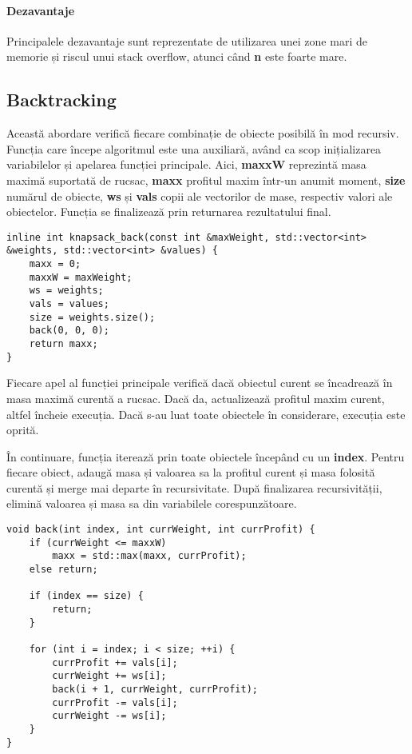 \documentclass[runningheads]{llncs}
\begin{document}
\paragraph{Dezavantaje} Principalele dezavantaje sunt reprezentate de utilizarea unei zone mari de memorie
și riscul unui stack overflow, atunci când \textbf{n} este foarte mare.

\subsection{Backtracking}

Această abordare verifică fiecare combinație de obiecte posibilă în mod recursiv. Funcția care începe
algoritmul este una auxiliară, având ca scop inițializarea variabilelor și apelarea funcției principale.
Aici, \textbf{maxxW} reprezintă masa maximă suportată de rucsac, \textbf{maxx} profitul maxim într-un anumit
moment, \textbf{size} numărul de obiecte, \textbf{ws} și \textbf{vals} copii ale vectorilor de mase, respectiv
valori ale obiectelor. Funcția se finalizează prin returnarea rezultatului final.

\begin{lstlisting}
inline int knapsack_back(const int &maxWeight, std::vector<int> &weights, std::vector<int> &values) {
	maxx = 0;
	maxxW = maxWeight;
	ws = weights;
	vals = values;
	size = weights.size();
	back(0, 0, 0);
	return maxx;
}
\end{lstlisting}

Fiecare apel al funcției principale verifică dacă obiectul curent se încadrează în
masa maximă curentă a rucsac. Dacă da, actualizează profitul maxim curent, altfel încheie
execuția. Dacă s-au luat toate obiectele în considerare, execuția este oprită.

În continuare, funcția iterează prin toate obiectele începând cu un \textbf{index}. Pentru
fiecare obiect, adaugă masa și valoarea sa la profitul curent și masa folosită curentă și
merge mai departe în recursivitate. După finalizarea recursivității, elimină valoarea și
masa sa din variabilele corespunzătoare.

\begin{lstlisting}
void back(int index, int currWeight, int currProfit) {
	if (currWeight <= maxxW)
		maxx = std::max(maxx, currProfit);
	else return;

	if (index == size) {
		return;
	}

	for (int i = index; i < size; ++i) {
		currProfit += vals[i];
		currWeight += ws[i];
		back(i + 1, currWeight, currProfit);
		currProfit -= vals[i];
		currWeight -= ws[i];
	}
}
\end{lstlisting}
\end{document}
